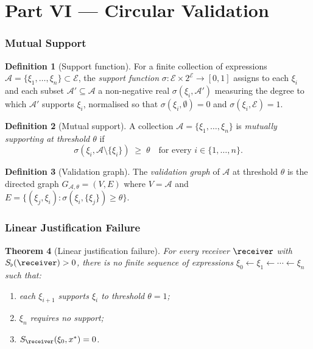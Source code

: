 \documentclass[11pt,a4paper]{article}
\theoremstyle{thmstyle}
\newtheorem{theorem}{Theorem}[section]
\theoremstyle{thmstyle}
\theoremstyle{definition}
\newtheorem{definition}[theorem]{Definition}
\theoremstyle{remark}
\newcommand{\Expr}{\mathcal{E}}
\newcommand{\Ax}{\mathcal{A}}
\newcommand{\Sscalar}{S}
\newcommand{\Sfloor}{S_{\flat}}
\begin{document}
\clearpage

\part*{Part VI --- Circular Validation}

\section{Mutual Support}
\label{sec:mutual-support}

\begin{definition}[Support function]\label{def:support}
For a finite collection of expressions
$\Ax = \{\xi_{1}, \ldots, \xi_{n}\} \subset \Expr$, the
\emph{support function} $\sigma : \Expr \times
2^{\Expr} \to [0, 1]$ assigns to each $\xi_{i}$ and
each subset $\Ax' \subseteq \Ax$ a non-negative real
$\sigma(\xi_{i}, \Ax')$ measuring the degree to which
$\Ax'$ supports $\xi_{i}$, normalised so that
$\sigma(\xi_{i}, \emptyset) = 0$ and
$\sigma(\xi_{i}, \Expr) = 1$.
\end{definition}

\begin{definition}[Mutual support]\label{def:mutual-support}
A collection $\Ax = \{\xi_{1}, \ldots, \xi_{n}\}$ is
\emph{mutually supporting at threshold $\theta$} if
\[
\sigma(\xi_{i}, \Ax \setminus \{\xi_{i}\}) \;\geq\; \theta
\quad \text{for every } i \in \{1, \ldots, n\}.
\]
\end{definition}

\begin{definition}[Validation graph]\label{def:val-graph}
The \emph{validation graph} of $\Ax$ at threshold
$\theta$ is the directed graph $G_{\Ax, \theta} =
(V, E)$ where $V = \Ax$ and
$E = \{(\xi_{j}, \xi_{i}) : \sigma(\xi_{i},
\{\xi_{j}\}) \geq \theta\}$.
\end{definition}

\section{Linear Justification Failure}
\label{sec:linear-failure}

\begin{theorem}[Linear justification failure]
\label{thm:linear-failure}
For every receiver $\receiver$ with $\Sfloor(\receiver)
> 0$, there is no finite sequence of expressions
$\xi_{0} \leftarrow \xi_{1} \leftarrow \cdots
\leftarrow \xi_{n}$ such that:
\begin{enumerate}[nosep,label=(\roman*)]
\item each $\xi_{i+1}$ supports $\xi_{i}$ to threshold
      $\theta = 1$;
\item $\xi_{n}$ requires no support;
\item $\Sscalar_{\receiver}(\xi_{0}, x^{*}) = 0$.
\end{enumerate}
\end{theorem}
\end{document}
